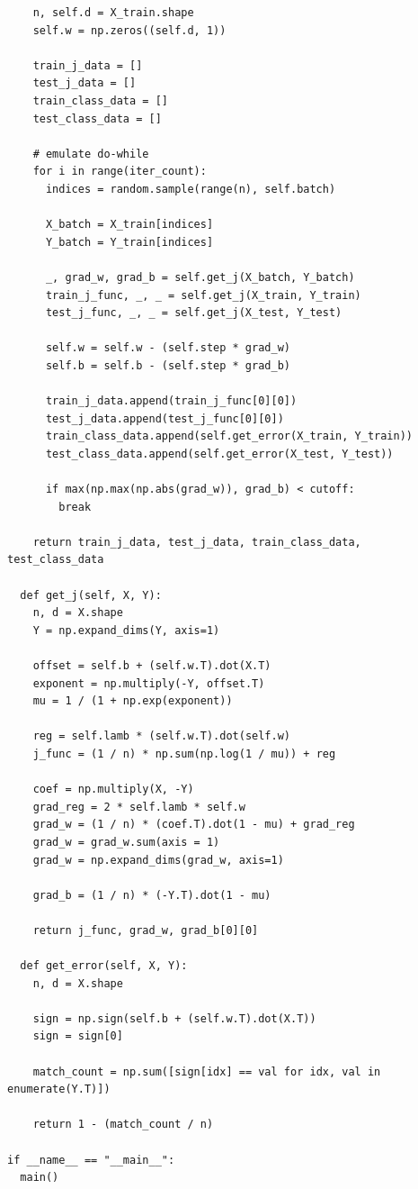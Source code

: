 \documentclass{article}
\newcommand{\1}{\mathbf{1}}
\begin{document}
{\begin{verbatim}
    n, self.d = X_train.shape
    self.w = np.zeros((self.d, 1))

    train_j_data = []
    test_j_data = []
    train_class_data = []
    test_class_data = []

    # emulate do-while
    for i in range(iter_count):
      indices = random.sample(range(n), self.batch)
      
      X_batch = X_train[indices]
      Y_batch = Y_train[indices]

      _, grad_w, grad_b = self.get_j(X_batch, Y_batch)
      train_j_func, _, _ = self.get_j(X_train, Y_train)
      test_j_func, _, _ = self.get_j(X_test, Y_test)

      self.w = self.w - (self.step * grad_w)
      self.b = self.b - (self.step * grad_b)

      train_j_data.append(train_j_func[0][0])
      test_j_data.append(test_j_func[0][0])
      train_class_data.append(self.get_error(X_train, Y_train))
      test_class_data.append(self.get_error(X_test, Y_test))

      if max(np.max(np.abs(grad_w)), grad_b) < cutoff:
        break

    return train_j_data, test_j_data, train_class_data, test_class_data

  def get_j(self, X, Y):
    n, d = X.shape
    Y = np.expand_dims(Y, axis=1)

    offset = self.b + (self.w.T).dot(X.T)
    exponent = np.multiply(-Y, offset.T)
    mu = 1 / (1 + np.exp(exponent))

    reg = self.lamb * (self.w.T).dot(self.w)
    j_func = (1 / n) * np.sum(np.log(1 / mu)) + reg

    coef = np.multiply(X, -Y)
    grad_reg = 2 * self.lamb * self.w
    grad_w = (1 / n) * (coef.T).dot(1 - mu) + grad_reg
    grad_w = grad_w.sum(axis = 1)
    grad_w = np.expand_dims(grad_w, axis=1)

    grad_b = (1 / n) * (-Y.T).dot(1 - mu)

    return j_func, grad_w, grad_b[0][0]

  def get_error(self, X, Y):
    n, d = X.shape

    sign = np.sign(self.b + (self.w.T).dot(X.T))
    sign = sign[0]

    match_count = np.sum([sign[idx] == val for idx, val in enumerate(Y.T)])

    return 1 - (match_count / n)

if __name__ == "__main__":
  main()


\end{verbatim}}
\end{document}
